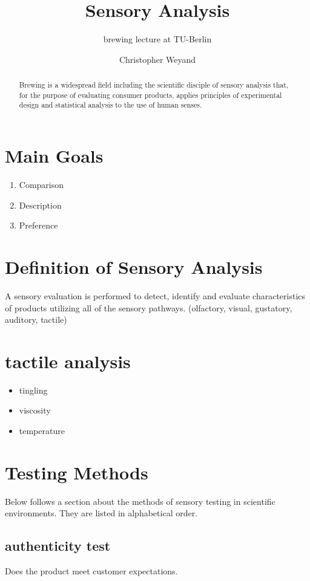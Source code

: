 \documentclass[]{scrartcl}
\begin{document}
\title{Sensory Analysis}
\subtitle{brewing lecture at TU-Berlin}
\author{Christopher Weyand}
\maketitle
\begin{abstract}
Brewing is a widespread field including the scientific disciple of sensory analysis
that, for the purpose of evaluating consumer products, applies principles of experimental
design and statistical analysis to the use of human senses.
\end{abstract}
\newpage

\tableofcontents
\newpage

\listoffigures
\newpage

\section{Main Goals}
\begin{enumerate}
  \item Comparison
  \item Description
  \item Preference
\end{enumerate}


\section{Definition of Sensory Analysis}
A sensory evaluation is performed to detect, identify and evaluate
characteristics of products utilizing all of the sensory pathways.
(olfactory, visual, gustatory, auditory, tactile)


\section{tactile analysis}
\begin{itemize}
  \item tingling
  \item viscosity
  \item temperature
\end{itemize}


\section{Testing Methods}
Below follows a section about the methods of sensory testing in scientific environments.
They are listed in alphabetical order.
\subsection{authenticity test}
Does the product meet customer expectations.
\end{document}
